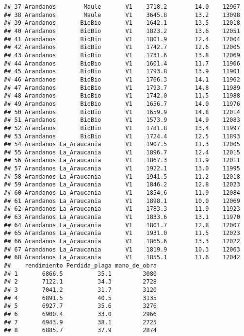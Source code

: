 \documentclass[]{book}
\begin{document}
\begin{verbatim}
## 37 Arandanos        Maule       V1    3718.2        14.0    12967
## 38 Arandanos        Maule       V1    3645.8        13.2    13098
## 39 Arandanos       BioBio       V1    1642.1        13.5    12018
## 40 Arandanos       BioBio       V1    1823.2        13.6    12051
## 41 Arandanos       BioBio       V1    1801.9        12.4    12004
## 42 Arandanos       BioBio       V1    1742.7        12.6    12005
## 43 Arandanos       BioBio       V1    1731.6        13.8    12069
## 44 Arandanos       BioBio       V1    1601.4        11.7    11906
## 45 Arandanos       BioBio       V1    1793.8        13.9    11901
## 46 Arandanos       BioBio       V1    1766.3        14.1    11962
## 47 Arandanos       BioBio       V1    1793.7        14.8    11989
## 48 Arandanos       BioBio       V1    1742.0        11.5    11988
## 49 Arandanos       BioBio       V1    1656.7        14.0    11976
## 50 Arandanos       BioBio       V1    1659.9        14.8    12014
## 51 Arandanos       BioBio       V1    1573.9        14.9    12083
## 52 Arandanos       BioBio       V1    1781.8        13.4    11997
## 53 Arandanos       BioBio       V1    1724.4        12.5    11893
## 54 Arandanos La_Araucania       V1    1907.5        11.3    12005
## 55 Arandanos La_Araucania       V1    1896.7        12.4    12015
## 56 Arandanos La_Araucania       V1    1867.3        11.9    12011
## 57 Arandanos La_Araucania       V1    1922.1        13.0    11995
## 58 Arandanos La_Araucania       V1    1941.5        11.2    12018
## 59 Arandanos La_Araucania       V1    1846.2        12.8    12023
## 60 Arandanos La_Araucania       V1    1854.6        11.9    12084
## 61 Arandanos La_Araucania       V1    1898.1        10.0    12069
## 62 Arandanos La_Araucania       V1    1783.3        11.9    11923
## 63 Arandanos La_Araucania       V1    1833.6        13.1    11970
## 64 Arandanos La_Araucania       V1    1801.7        12.8    12007
## 65 Arandanos La_Araucania       V1    1931.0        11.5    12023
## 66 Arandanos La_Araucania       V1    1865.6        13.3    12022
## 67 Arandanos La_Araucania       V1    1819.9        10.3    12063
## 68 Arandanos La_Araucania       V1    1855.1        11.6    12042
##    rendimiento Perdida_plaga mano_de_obra
## 1       6866.5          35.1         3080
## 2       7122.1          34.3         2728
## 3       7041.2          31.7         3120
## 4       6891.5          40.5         3135
## 5       6927.7          35.6         3276
## 6       6900.4          33.0         2966
## 7       6943.9          38.1         2725
## 8       6885.7          37.9         2874

\end{verbatim}
\end{document}
